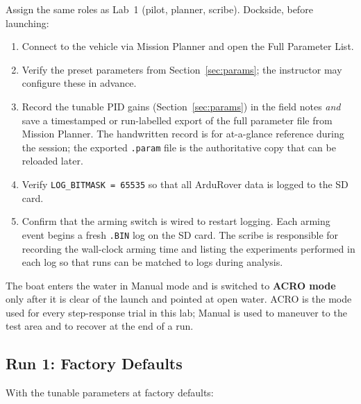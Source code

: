 \documentclass[../../book.tex]{subfiles}
\begin{document}
Assign the same roles as Lab~1 (pilot, planner, scribe).  Dockside, before launching:

\begin{enumerate}
  \item Connect to the vehicle via Mission Planner and open the Full Parameter List.
  \item Verify the preset parameters from Section~\ref{sec:params}; the instructor may configure these in advance.
  \item Record the tunable PID gains (Section~\ref{sec:params}) in the field notes \emph{and} save a timestamped or run-labelled export of the full parameter file from Mission Planner.  The handwritten record is for at-a-glance reference during the session; the exported \texttt{.param} file is the authoritative copy that can be reloaded later.
  \item Verify \texttt{LOG\_BITMASK = 65535} so that all ArduRover data is logged to the SD card.
  \item Confirm that the arming switch is wired to restart logging.  Each arming event begins a fresh \texttt{.BIN} log on the SD card.  The scribe is responsible for recording the wall-clock arming time and listing the experiments performed in each log so that runs can be matched to logs during analysis.
\end{enumerate}

The boat enters the water in Manual mode and is switched to \textbf{ACRO mode} only after it is clear of the launch and pointed at open water.  ACRO is the mode used for every step-response trial in this lab; Manual is used to maneuver to the test area and to recover at the end of a run.

\subsection{Run 1: Factory Defaults}

With the tunable parameters at factory defaults:
\end{document}
